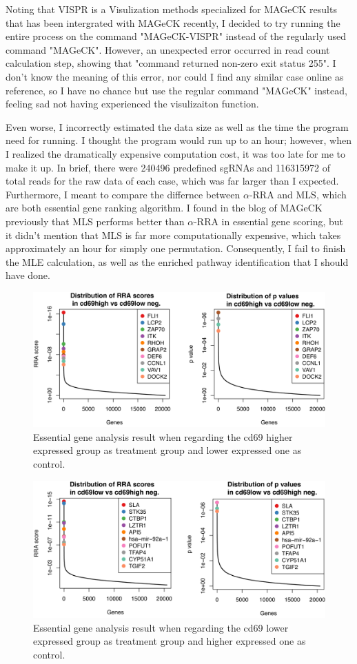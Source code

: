 \documentclass[fleqn,10pt]{wlscirep}
\begin{document}
Noting that VISPR is a Visulization methods specialized for MAGeCK results that has been intergrated with MAGeCK recently, I decided to try running the entire process on the command "MAGeCK-VISPR" instead of the regularly used command "MAGeCK".  However, an unexpected error occurred in read count calculation step, showing that "command returned non-zero exit status 255".  I don't know the meaning of this error, nor could I find any similar case online as reference, so I have no chance but use the regular command "MAGeCK" instead, feeling sad not having experienced the visulizaiton function.

Even worse, I incorrectly estimated the data size as well as the time the program need for running.  I thought the program would run up to an hour;   however, when I realized the dramatically expensive computation cost, it was too late for me to make it up. In brief, there were 240496 predefined sgRNAs and 116315972 of total reads for the raw data of each case, which was far larger than I expected.  Furthermore, I meant to compare the differnce between $\alpha$-RRA and MLS, which are both essential gene ranking algorithm.  I found in the blog of MAGeCK previously that MLS performs better than $\alpha$-RRA in essential gene scoring, but it didn't mention that MLS is far more computationally expensive, which takes approximately an hour for simply one permutation.  Consequently, I fail to finish the MLE calculation, as well as the enriched pathway identification that I should have done. 




\begin{figure}[ht]
\centering
\includegraphics[width=\linewidth]{up_down}
\caption{Essential gene analysis result when regarding the cd69 higher expressed group as treatment group and lower expressed one as control.}
\label{fig:up_down}
\end{figure}

\begin{figure}[ht]
    \centering
    \includegraphics[width=\linewidth]{down_up}
    \caption{Essential gene analysis result when regarding the cd69 lower expressed group as treatment group and higher expressed one as control.}
    \label{fig:down_up}
    \end{figure}
\end{document}
